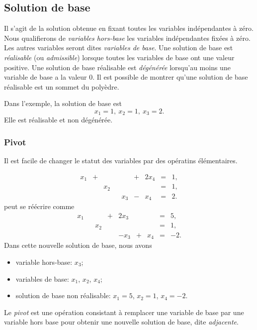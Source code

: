 \subsection{Solution de base}

Il s'agit de la solution obtenue en fixant toutes les variables indépendantes à zéro.
Nous qualifierons de {\sl variables hors-base} les variables indépendantes fixées à zéro.
Les autres variables seront dites {\sl variables de base}.
Une solution de base est {\sl réalisable} (ou {\sl admissible}) lorsque toutes les variables de base ont une valeur positive.
Une solution de base réalisable est {\sl dégénérée} lorsqu'au moins une variable de base a la valeur 0.
Il est possible de montrer qu'une solution de base réalisable est un sommet du polyèdre.

\begin{example}
Dans l'exemple, la solution de base est
\[
x_1 = 1,\ x_2 = 1,\ x_3 = 2.
\]
Elle est réalisable et non dégénérée.
\end{example}

\subsubsection{Pivot}

Il est facile de changer le statut des variables par des opératins élémentaires.
\begin{example}
\[
\begin{matrix}
x_1 & + & & & & + & 2x_4 & = & 1, \\
& & x_2 & & & & & = & 1, \\
& & & & x_3 & - & x_4 & = & 2.
\end{matrix}
\]
peut se réécrire comme
\[
\begin{matrix}
x_1 & & & + & 2x_3& & & = & 5, \\
& & x_2 & & & & & = & 1, \\
& & & & -x_3 & + & x_4 & = & -2.
\end{matrix}
\]
Dans cette nouvelle solution de base, nous avons
\begin{itemize}
\item
variable hors-base: $x_3$;
\item
variables de base: $x_1$, $x_2$, $x_4$;
\item
solution de base non réalisable: $x_1 = 5$, $x_2 = 1$, $x_4 = -2$.
\end{itemize}
\end{example}
Le {\sl pivot} est une opération consistant à remplacer une variable de base par une variable hors base pour obtenir une nouvelle solution de base, dite {\sl adjacente}.

